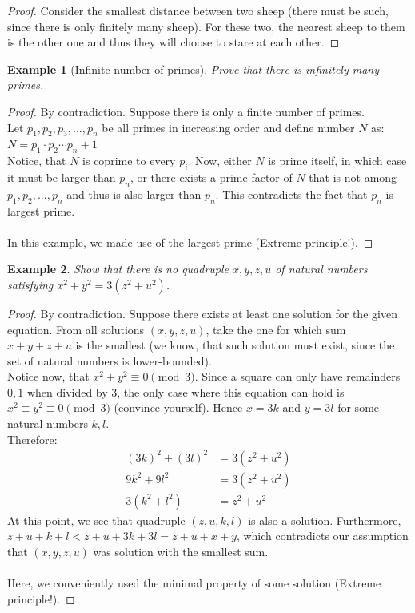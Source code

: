 \documentclass[12pt]{article}
\newtheorem{theorem}{Example}
\begin{document}
\begin{proof}
Consider the smallest distance between two sheep (there must be such, since there is only finitely many sheep). For these two, the nearest sheep to them is the other one and thus they will choose to stare at each other.
\end{proof}

\begin{theorem}[Infinite number of primes]
Prove that there is infinitely many primes.
\end{theorem}

\begin{proof}
By contradiction. Suppose there is only a finite number of primes. \\ Let $p_{1}, p_{2}, p_{3}, ..., p_{n}$ be all primes in increasing order and define number $N$ as: \\
$N = p_{1} \cdot p_{2} \cdots p_{n} + 1$ \\
Notice, that $N$ is coprime to every $p_{i}$.
Now, either $N$ is prime itself, in which case it must be larger than $p_{n}$, or there exists a prime factor of $N$ that is not among $p_{1}, p_{2}, ..., p_{n}$ and thus is also larger than $p_{n}$. This contradicts the fact that $p_{n}$ is largest prime. \qedhere
\\\\
In this example, we made use of the largest prime (Extreme principle!). 
\end{proof}

\begin{theorem} 
Show that there is no quadruple $x, y, z, u$ of natural numbers satisfying
$x^{2} + y^{2} = 3(z^{2} + u^{2})$.
\end{theorem}

\begin{proof}
By contradiction. Suppose there exists at least one solution for the given equation. From all solutions $(x, y, z, u)$, take the one for which sum $x + y + z + u$ is the smallest (we know, that such solution must exist, since the set of natural numbers is lower-bounded). \\
Notice now, that $x^{2} + y^{2} \equiv 0 \pmod 3$. Since a square can only have remainders $0, 1$ when divided by $3$, the only case where this equation can hold is $x^{2} \equiv y^{2} \equiv 0 \pmod 3$ (convince yourself). Hence $x = 3k$ and $y = 3l$ for some natural numbers $k, l$. \\
Therefore: 
\begin{align*} 
{(3k)}^{2} + {(3l)}^{2} &= 3(z^{2} + u^{2})\\
9k^{2} + 9l^{2} &= 3(z^{2} + u^{2}) \\
3(k^{2} + l^{2}) &= z^{2} + u^{2}
\end{align*}
At this point, we see that quadruple $(z, u, k, l)$ is also a solution. Furthermore, $z + u + k + l < z + u + 3k + 3l = z + u + x + y$, which contradicts our assumption that $(x, y, z, u)$ was solution with the smallest sum. \qedhere
\\\\
Here, we conveniently used the minimal property of some solution (Extreme principle!).
\end{proof}
\end{document}
